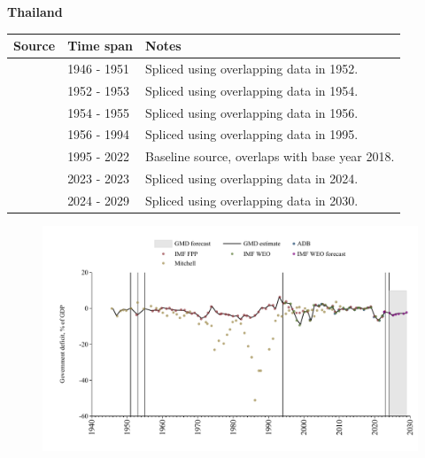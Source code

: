 \documentclass[12pt,a4paper,landscape]{article}
\begin{document}
\begin{adjustbox}{max totalsize={\paperwidth}{\paperheight},center}
\begin{minipage}[t][\textheight][t]{\textwidth}
\vspace*{0.5cm}
{}
\begin{center}
{\Large\bfseries Thailand}
\end{center}
\vspace{0.5cm}
\begin{table}[H]
\centering
\small
\begin{tabular}{|l|l|l|}
\hline
\textbf{Source} & \textbf{Time span} & \textbf{Notes} \\
\hline
\rowcolor{white}\cite{Mitchell}& 1946 - 1951 &Spliced using overlapping data in 1952.\\
\rowcolor{lightgray}\cite{IMF_FPP}& 1952 - 1953 &Spliced using overlapping data in 1954.\\
\rowcolor{white}\cite{Mitchell}& 1954 - 1955 &Spliced using overlapping data in 1956.\\
\rowcolor{lightgray}\cite{IMF_FPP}& 1956 - 1994 &Spliced using overlapping data in 1995.\\
\rowcolor{white}\cite{IMF_WEO}& 1995 - 2022 &Baseline source, overlaps with base year 2018.\\
\rowcolor{lightgray}\cite{IMF_FPP}& 2023 - 2023 &Spliced using overlapping data in 2024.\\
\rowcolor{white}\cite{IMF_WEO_forecast}& 2024 - 2029 &Spliced using overlapping data in 2030.\\
\hline
\end{tabular}
\end{table}
\begin{figure}[H]
\centering
\includegraphics[width=\textwidth,height=0.6\textheight,keepaspectratio]{graphs/THA_govdef_GDP.pdf}
\end{figure}
\end{minipage}
\end{adjustbox}
\end{document}

